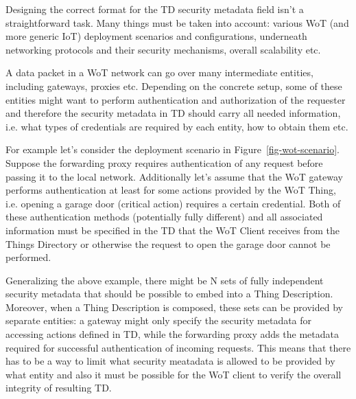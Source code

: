 
Designing the correct format for the TD security metadata field isn't a straightforward task.
Many things must be taken into account: various WoT (and more generic IoT) deployment scenarios and configurations, underneath networking protocols and their security mechanisms, overall scalability etc.

A data packet in a WoT network can go over many intermediate entities, including gateways, proxies etc.
Depending on the concrete setup, some of these entities might want to perform authentication and authorization of the requester and therefore the security metadata in TD should carry all needed information, i.e. what types of credentials are required by each entity, how to obtain them etc.

For example let's consider the deployment scenario in Figure~\ref{fig-wot-scenario}.
Suppose the forwarding proxy requires authentication of any request before passing it to the local network.
Additionally let's assume that the WoT gateway performs authentication at least for some actions provided by the WoT Thing, i.e. opening a garage door (critical action) requires a certain credential.
Both of these authentication methods (potentially fully different) and all associated information must be specified in the TD that the WoT Client receives from the Things Directory or otherwise the request to open the garage door cannot be performed.

Generalizing the above example, there might be N sets of fully independent security metadata that should be possible to embed into a Thing Description.
Moreover, when a Thing Description is composed, these sets can be provided by separate entities: a gateway might only specify the security metadata for accessing actions defined in TD, while the forwarding proxy adds the metadata required for successful authentication of incoming requests.
This means that there has to be a way to limit what security meatadata is allowed to be provided by what entity and also it must be possible for the WoT client to verify the overall integrity of resulting TD. 
 

